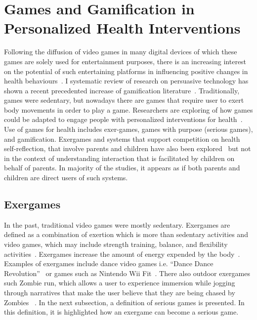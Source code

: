 \section{Games and Gamification in Personalized Health Interventions}
Following the diffusion of video games in many digital devices of which these games are solely used for entertainment purposes, there is an increasing interest on the potential of such entertaining platforms in influencing positive changes in health behaviours~\citep{king2013gamification}. I systematic review of research on persuasive technology has shown a recent precedented increase of gamification literature~\citep{hamari2014persuasive}. Traditionally, games were sedentary, but nowadays there are games that require user to exert body movements in order to play a game. Researchers are exploring of how games could be adapted to engage people with personalized interventions for health~\citep{mccallum2012gamification}. Use of games for health includes exer-games, games with purpose (serious games), and gamification. Exergames and systems that support competition on health self-reflection, that involve  parents and children have also been explored~\citep{grimes2009toward,saksono2015spaceship} but not in the context of understanding interaction that is facilitated by children on behalf of parents. In majority of the studies, it appears as if both parents and children are direct users of such systems.
\subsection{Exergames}
In the past, traditional video games were mostly sedentary. Exergames are defined as a combination of exertion which is more than sedentary activities and video games, which may include strength training, balance, and flexibility activities~\citep{oh2010defining}. Exergames increase the amount of energy expended by the body~\citep{graves2010physiological}. Examples of exergames include  dance video games i.e. ``Dance Dance Revolution''~\citep{lieberman2006dance} or games such as Nintendo Wii Fit~\citep{gobel2010serious}. There also outdoor exergames such Zombie run, which allows a user to experience immersion while jogging through narratives that make the user believe that they are being chased by Zombies ~\citep{southerton2013zombies}. In the next subsection, a definition of serious games is presented. In this definition, it is highlighted how an exergame can become a serious game. 
